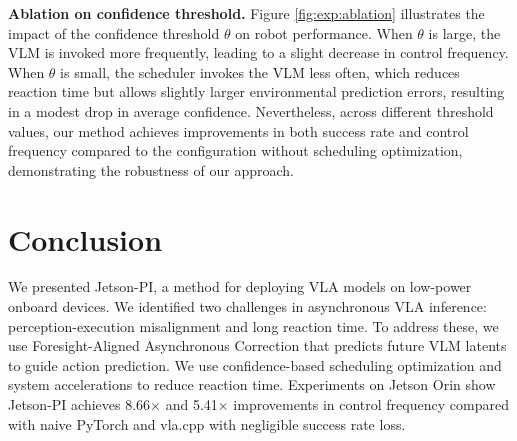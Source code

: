 


\textbf{Ablation on confidence threshold.}
Figure \ref{fig:exp:ablation} illustrates the impact of the confidence threshold $\theta$ on robot performance. When $\theta$ is large, the VLM is invoked more frequently, leading to a slight decrease in control frequency. When $\theta$ is small, the scheduler invokes the VLM less often, which reduces reaction time but allows slightly larger environmental prediction errors, resulting in a modest drop in average confidence. Nevertheless, across different threshold values, our method achieves improvements in both success rate and control frequency compared to the configuration without scheduling optimization, demonstrating the robustness of our approach.



\section{Conclusion}
We presented Jetson-PI, a method for deploying VLA models on low-power onboard devices. We identified two challenges in asynchronous VLA inference: perception-execution misalignment and long reaction time. To address these, we use Foresight-Aligned Asynchronous Correction that predicts future VLM latents to guide action prediction. We use confidence-based scheduling optimization and system accelerations to reduce reaction time.
Experiments on Jetson Orin show Jetson-PI achieves 8.66$\times$ and 5.41$\times$ improvements in control frequency compared with naive PyTorch and vla.cpp with negligible success rate loss.

